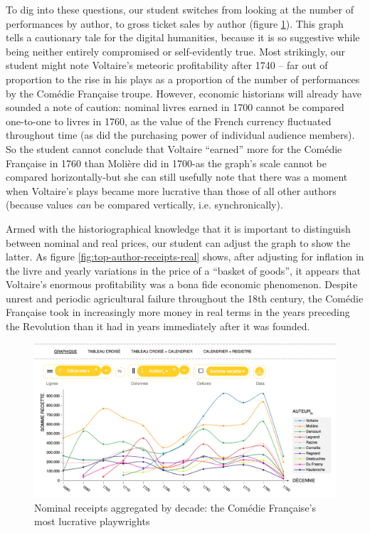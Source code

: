 \documentclass[	DIV=calc,%
							paper=a4,%
							fontsize=11pt,%
							twocolumn]{scrartcl}	 					%
\begin{document}
To dig into these questions, our student switches from looking at the number of performances by author, to gross ticket sales by author (figure \ref{fig:top-author-receipts}).  This graph tells a cautionary tale for the digital humanities, because it is so suggestive while being neither entirely compromised or self-evidently true.  Most strikingly, our student might note Voltaire's meteoric profitability after 1740 -- far out of proportion to the rise in his plays as a proportion of the number of performances by the Comédie Française troupe.  However, economic historians will already have sounded a note of caution: nominal livres earned in 1700 cannot be compared one-to-one to livres in 1760, as the value of the French currency fluctuated throughout time (as did the purchasing power of individual audience members).  So the student cannot conclude that Voltaire ``earned'' more for the Comédie Française in 1760 than Molière did in 1700-as the graph's scale cannot be compared horizontally-but she can still usefully note that there was a moment when Voltaire's plays became more lucrative than those of all other authors (because values \emph{can} be compared vertically, i.e. synchronically).

Armed with the historiographical knowledge that it is important to distinguish between nominal and real prices, our student can adjust the graph to show the latter. As figure \ref{fig:top-author-receipts-real} shows, after adjusting for inflation in the livre and yearly variations in the price of a ``basket of goods'', it appears that Voltaire's enormous profitability was a bona fide economic phenomenon.  Despite unrest and periodic agricultural failure throughout the 18th century, the Comédie Française took in increasingly more money in real terms in the years preceding the Revolution than it had in years immediately after it was founded.

\begin{figure}
  \centering
	\includegraphics[width=7in]{steps/top-author-receipts-nominal.png}
	\caption{Nominal receipts aggregated by decade: the Comédie Française's most lucrative playwrights}
	\label{fig:top-author-receipts}
\end{figure}
\end{document}
